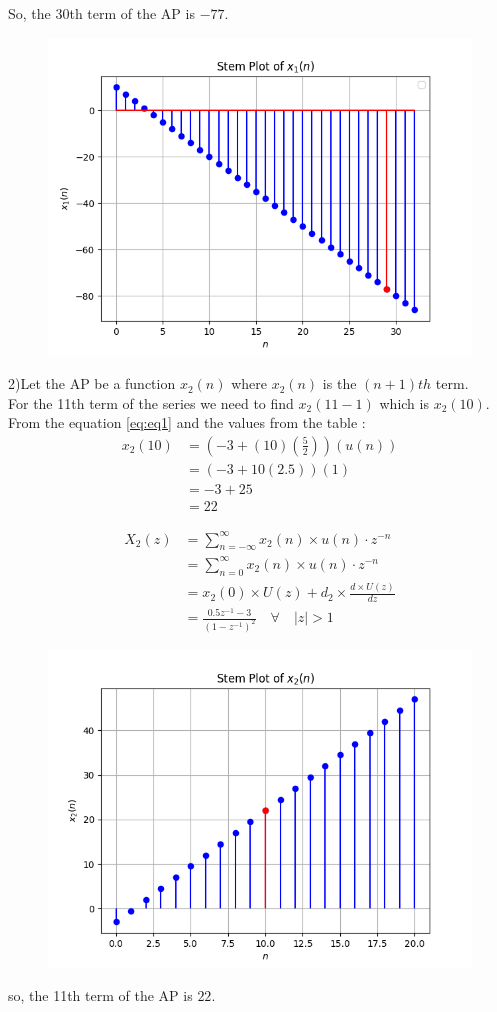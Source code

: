 \documentclass[journal,12pt,twocolumn]{IEEEtran}
\theoremstyle{remark}
\begin{document}
So, the 30th term of the AP is $-77$.\\
\begin{figure}[h!]
    \centering
    \includegraphics[width=\columnwidth]{figs/plot1.png}
    \label{fig:1}
\end{figure}

2)Let the AP be a function $x_2(n)$ where $x_2(n)$ is the $(n+1)th$ term.\\
For the 11th term of the series we need to find $x_2(11-1)$ which is $x_2(10)$.\\
From the equation \eqref{eq:eq1} and the values from the table  :
\begin{align}
x_2(10) &= (-3 + (10)\left(\frac{5}{2}\right))(u(n))\\
&= (-3 + 10(2.5))(1)\\
& = -3 + 25 \\
&= 22
\end{align}

\begin{align}
X_2(z) &= \sum_{n=-\infty}^{\infty} x_2(n)\times u(n) \cdot z^{-n}\\
       &= \sum_{n=0}^{\infty} x_2(n)\times u(n) \cdot z^{-n}\\
       &= x_2(0)\times U(z) + d_2\times \frac{d\times U(z)}{dz}\\
       &= \frac{0.5z^{-1}-3}{(1-z^{-1})^2} \quad \forall \quad |z| > 1
\end{align}


\begin{figure}[h!]
    \centering
    \includegraphics[width=\columnwidth]{figs/plot2.png}
    \label{fig:2}
\end{figure}
so, the 11th term of the AP is $22$.
\end{document}
